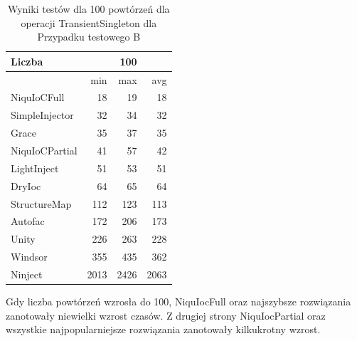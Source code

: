 \documentclass[12pt]{article}
\begin{document}
\begin{table}[H]
\captionsetup{belowskip=0pt,aboveskip=0pt}
\begin{center}
\begin{small}
	\begin{tabular}{ | l | r r r | }
    		\hline
Liczba & & 100 & \\ \hline
 & min & max & avg \\ \hline
NiquIoCFull & 18 & 19 & 18 \\ \hline
SimpleInjector & 32 & 34 & 32 \\ \hline
Grace & 35 & 37 & 35 \\ \hline
NiquIoCPartial & 41 & 57 & 42 \\ \hline
LightInject & 51 & 53 & 51 \\ \hline
DryIoc & 64 & 65 & 64 \\ \hline
StructureMap & 112 & 123 & 113 \\ \hline
Autofac & 172 & 206 & 173 \\ \hline
Unity & 226 & 263 & 228 \\ \hline
Windsor & 355 & 435 & 362 \\ \hline
Ninject & 2013 & 2426 & 2063 \\ \hline
  	\end{tabular}
\end{small}
\end{center}
\caption{Wyniki testów dla 100 powtórzeń dla operacji TransientSingleton dla Przypadku testowego B}
\label{TestCaseB_TransientSingleton100}
\end{table}
Gdy liczba powtórzeń wzrosła do 100, NiquIocFull oraz najszybsze rozwiązania zanotowały niewielki wzrost czasów. Z drugiej strony NiquIocPartial oraz wszystkie najpopularniejsze rozwiązania zanotowały kilkukrotny wzrost.
\\ \\
\end{document}
